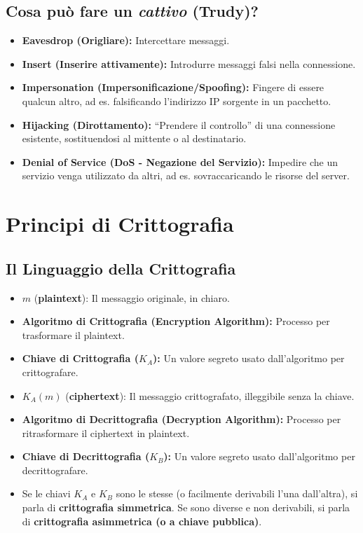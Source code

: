\documentclass{article}
\begin{document}
\subsection{Cosa può fare un \textit{cattivo} (Trudy)?}
\begin{itemize}
    \item \textbf{Eavesdrop (Origliare):} Intercettare messaggi.
    \item \textbf{Insert (Inserire attivamente):} Introdurre messaggi falsi nella connessione.
    \item \textbf{Impersonation (Impersonificazione/Spoofing):} Fingere di essere qualcun altro, ad es. falsificando l'indirizzo IP sorgente in un pacchetto.
    \item \textbf{Hijacking (Dirottamento):} \textquotedblleft Prendere il controllo\textquotedblright{} di una connessione esistente, sostituendosi al mittente o al destinatario.
    \item \textbf{Denial of Service (DoS - Negazione del Servizio):} Impedire che un servizio venga utilizzato da altri, ad es. sovraccaricando le risorse del server.
\end{itemize}

\section{Principi di Crittografia}
\label{sec:principi_crittografia}

\subsection{Il Linguaggio della Crittografia}
\begin{itemize}
    \item $m$ (\textbf{plaintext}): Il messaggio originale, in chiaro.
    \item \textbf{Algoritmo di Crittografia (Encryption Algorithm):} Processo per trasformare il plaintext.
    \item \textbf{Chiave di Crittografia ($K_A$):} Un valore segreto usato dall'algoritmo per crittografare.
    \item $K_A(m)$ (\textbf{ciphertext}): Il messaggio crittografato, illeggibile senza la chiave.
    \item \textbf{Algoritmo di Decrittografia (Decryption Algorithm):} Processo per ritrasformare il ciphertext in plaintext.
    \item \textbf{Chiave di Decrittografia ($K_B$):} Un valore segreto usato dall'algoritmo per decrittografare.
    \item Se le chiavi $K_A$ e $K_B$ sono le stesse (o facilmente derivabili l'una dall'altra), si parla di \textbf{crittografia simmetrica}. Se sono diverse e non derivabili, si parla di \textbf{crittografia asimmetrica (o a chiave pubblica)}.
\end{itemize}
\end{document}
